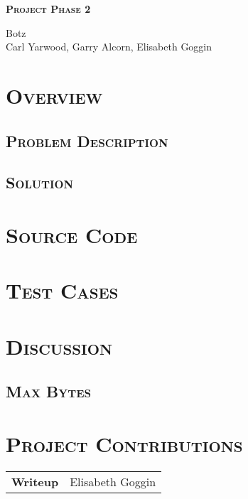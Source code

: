 \documentclass[12pt]{article}
\begin{document}
	\vspace*{2em}
	
	\begin{center}
		{\LARGE {}\selectfont\scshape\textbf{Project Phase 2}}
		
		{\large Botz\\}
		{\footnotesize Carl Yarwood, Garry Alcorn, Elisabeth Goggin}
	\end{center}
	
	\vspace*{2em}
	
	\section[Overview]{\large{}\selectfont\scshape Overview}
	
	\subsection[Problem Description]{\normalsize{}\selectfont\scshape Problem Description}
	
	\subsection[Solution]{\normalsize{}\selectfont\scshape Solution}
	
	\section[Source Code]{\large{}\selectfont\scshape Source Code}
	
	\section[Test Cases]{\large{}\selectfont\scshape Test Cases}
	
	\section[Discussion]{\large{}\selectfont\scshape Discussion}
	
	\subsection[Max Bytes]{\normalsize{}\selectfont\scshape Max Bytes}
	
	\section[Project Contributions]{\large{}\selectfont\scshape Project Contributions}
	
	\begin{center}
		{\scshape\scriptsize
		\begin{tabular}{r l}
			\bfseries Writeup & Elisabeth Goggin\\
		\end{tabular}
		}
	\end{center}
	
\end{document}
